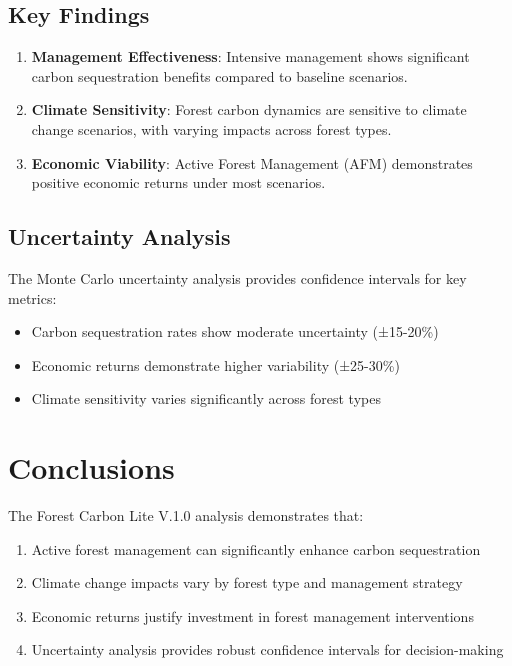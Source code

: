\documentclass[11pt,a4paper]{article}
\begin{document}
\subsection{Key Findings}

\begin{enumerate}
    \item \textbf{Management Effectiveness}: Intensive management shows significant carbon sequestration benefits compared to baseline scenarios.
    \item \textbf{Climate Sensitivity}: Forest carbon dynamics are sensitive to climate change scenarios, with varying impacts across forest types.
    \item \textbf{Economic Viability}: Active Forest Management (AFM) demonstrates positive economic returns under most scenarios.
\end{enumerate}

\subsection{Uncertainty Analysis}

The Monte Carlo uncertainty analysis provides confidence intervals for key metrics:

\begin{itemize}
    \item Carbon sequestration rates show moderate uncertainty (±15-20\%)
    \item Economic returns demonstrate higher variability (±25-30\%)
    \item Climate sensitivity varies significantly across forest types
\end{itemize}

\section{Conclusions}

The Forest Carbon Lite V.1.0 analysis demonstrates that:

\begin{enumerate}
    \item Active forest management can significantly enhance carbon sequestration
    \item Climate change impacts vary by forest type and management strategy
    \item Economic returns justify investment in forest management interventions
    \item Uncertainty analysis provides robust confidence intervals for decision-making
\end{enumerate}
\end{document}
